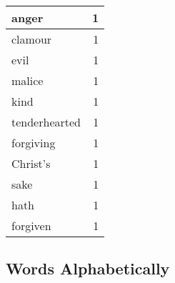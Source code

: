 \begin{center}
\begin{longtable}{l|r}
anger & 1\\ \hline 
clamour & 1\\ \hline 
evil & 1\\ \hline 
malice & 1\\ \hline 
kind & 1\\ \hline 
tenderhearted & 1\\ \hline 
forgiving & 1\\ \hline 
Christ's & 1\\ \hline 
sake & 1\\ \hline 
hath & 1\\ \hline 
forgiven & 1\\ \hline 
\end{longtable}  
\end{center}  


  
\normalsize  

  
  


\subsection{Words Alphabetically}

